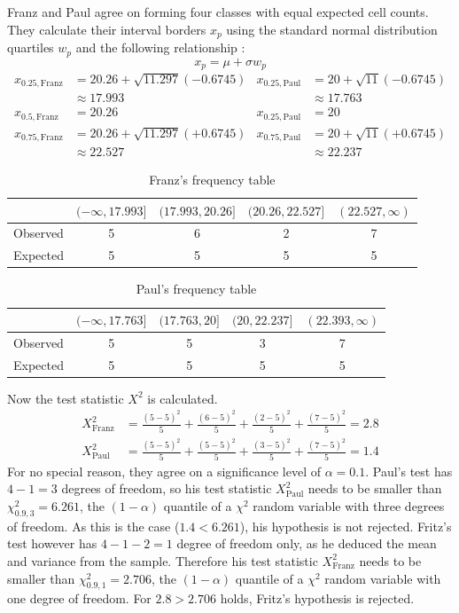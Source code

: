 \documentclass{article}
\begin{document}
Franz and Paul agree on forming four classes with equal expected cell counts.
They calculate their interval borders $x_p$ using the standard normal distribution quartiles $w_p$ and the following relationship \cite{conover1980practical}:
\begin{equation*}
	x_p = \mu + \sigma w_p
\end{equation*}
%
\begin{align*}
	x_{0.25, \text{Franz}} &= 20.26 + \sqrt{11.297}(-0.6745) & x_{0.25, \text{Paul}} &= 20 + \sqrt{11}(-0.6745) \\
	&\approx 17.993 & &\approx 17.763 \\[1ex]
	x_{0.5, \text{Franz}} &= 20.26 & x_{0.25, \text{Paul}} &= 20 \\[1ex]
	x_{0.75, \text{Franz}} &= 20.26 + \sqrt{11.297}(+0.6745) & x_{0.75, \text{Paul}} &= 20 + \sqrt{11}(+0.6745) \\
	&\approx 22.527 & &\approx 22.237
\end{align*}
%
\begin{table}[h]
\center
\caption{Franz's frequency table}
\begin{tabular}{l|cccc}
	& $(-\infty, 17.993]$ & $(17.993, 20.26]$ & $(20.26, 22.527]$ & $(22.527,\infty)$ \\
	\hline
	Observed & 5 & 6 & 2 & 7 \\
	Expected & 5 & 5 & 5 & 5 \\
\end{tabular}
\end{table}
\begin{table}[h]
\center
\caption{Paul's frequency table}
\begin{tabular}{l|cccc}
	& $(-\infty, 17.763]$ & $(17.763, 20]$ & $(20, 22.237]$ & $(22.393,\infty)$ \\
	\hline
	Observed & 5 & 5 & 3 & 7 \\
	Expected & 5 & 5 & 5 & 5 \\
\end{tabular}
\end{table}
Now the test statistic $X^2$ is calculated.
\begin{align*}
	X^2_{\text{Franz}} &= \frac{(5-5)^2}{5} + \frac{(6-5)^2}{5} + \frac{(2-5)^2}{5} + \frac{(7-5)^2}{5} = 2.8
	\\[1ex]
	X^2_{\text{Paul}} &= \frac{(5-5)^2}{5} + \frac{(5-5)^2}{5} + \frac{(3-5)^2}{5} + \frac{(7-5)^2}{5} = 1.4
\end{align*}
%
For no special reason, they agree on a significance level of $\alpha = 0.1$.
Paul's test has $4-1=3$ degrees of freedom, so his test statistic $X^2_{\text{Paul}}$ needs to be smaller than $\chi^2_{0.9, 3} = 6.261$, the $(1-\alpha)$ quantile of a $\chi^2$ random variable with three degrees of freedom.
As this is the case ($1.4 < 6.261$), his hypothesis is not rejected.
Fritz's test however has $4-1-2=1$ degree of freedom only, as he deduced the mean and variance from the sample.
Therefore his test statistic $X^2_{\text{Franz}}$ needs to be smaller than $\chi^2_{0.9, 1} = 2.706$, the $(1-\alpha)$ quantile of a $\chi^2$ random variable with one degree of freedom.
For $2.8 > 2.706$ holds, Fritz's hypothesis is rejected.
\end{document}

